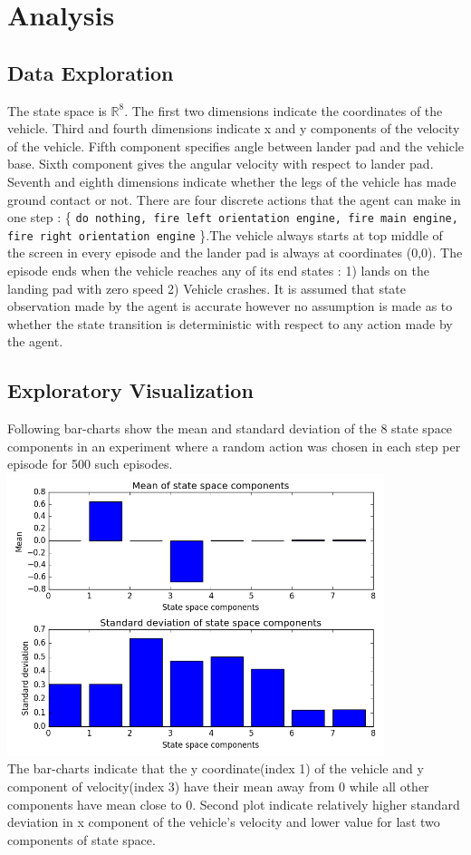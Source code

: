 \documentclass{svproc}
\begin{document}
\section{Analysis}
\subsection*{Data Exploration}
The state space is $\mathbb{R}^8$. The first two dimensions indicate the coordinates of the vehicle. Third and fourth dimensions indicate x and y components of the velocity of the vehicle. Fifth component specifies angle between lander pad and the vehicle base. Sixth component gives the angular velocity with respect to lander pad. Seventh and eighth dimensions indicate whether the legs of the vehicle has made ground contact or not. There are four discrete actions that the agent can make in one step : \{ \texttt{do nothing, fire left orientation engine, fire main engine, fire right orientation engine} \}.The vehicle always starts at top middle of the screen in every episode and the lander pad is always at coordinates (0,0). The episode ends when the vehicle reaches any of its end states : 1) lands on the landing pad with zero speed 2) Vehicle crashes. It is assumed that state observation made by the agent is accurate however no assumption is made as to whether the state transition is deterministic with respect to any action made by the agent.
\subsection*{Exploratory Visualization}
Following bar-charts show the mean and standard deviation of the 8 state space components in an experiment where a random action was chosen in each step per episode for 500 such episodes.\\
\includegraphics[width=11cm]{img/state-space}\\
The bar-charts indicate that the y coordinate(index 1) of the vehicle and y component of velocity(index 3) have their mean away from 0 while all other components have mean close to 0. Second plot indicate relatively higher standard deviation in x component of the vehicle's velocity and lower value for last two components of state space.
\end{document}
